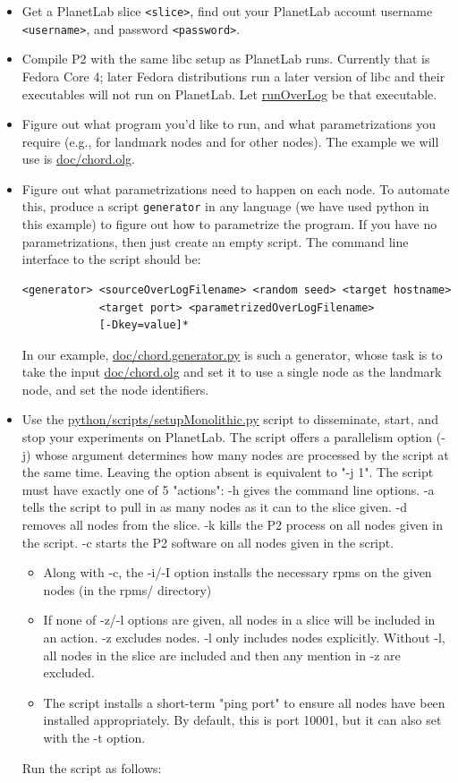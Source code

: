 \documentclass{article}
\begin{document}
\begin{itemize}
\item Get a PlanetLab slice \texttt{<slice>}, find out your PlanetLab account
username \texttt{<username>}, and password \texttt{<password>}.
\item Compile P2 with the same libc setup as PlanetLab runs.  Currently
that is Fedora Core 4; later Fedora distributions run a later version of libc and
their executables will not run on PlanetLab.  Let \url{runOverLog} be that
executable. 
\item Figure out what \ol program you'd like to run, and what
parametrizations you require (e.g., for landmark nodes and for other
nodes).  The example we will use is \url{doc/chord.olg}.
\item Figure out what parametrizations need to happen on each node.  To
automate this, produce a script \texttt{generator} in any language (we have
used python in this example) to figure out how to parametrize the
\ol program. If you have no parametrizations, then just create an
empty script.  The command line interface to the script should be:
\begin{verbatim}
<generator> <sourceOverLogFilename> <random seed> <target hostname>
            <target port> <parametrizedOverLogFilename>
            [-Dkey=value]*
\end{verbatim}
In our example, \url{doc/chord.generator.py} is such a generator, whose task
is to take the input \url{doc/chord.olg} and set it to use a single node as
the landmark node, and set the node identifiers.
\item Use the \url{python/scripts/setupMonolithic.py} script to disseminate,
start, and stop your experiments on PlanetLab.  The script offers a
parallelism option (-j) whose argument determines how many nodes are
processed by the script at the same time. Leaving the option absent is
equivalent to "-j 1".  The script must have exactly one of 5 "actions":
-h gives the command line options. -a tells the script to pull in as
many nodes as it can to the slice given. -d removes all nodes from the
slice. -k kills the P2 process on all nodes given in the script.  -c
starts the P2 software on all nodes given in the script.
\begin{itemize}
\item Along with -c, the -i/-I option installs the necessary rpms on the
     given nodes (in the rpms/ directory)
\item If none of -z/-l options are given, all nodes in a slice will be
     included in an action.  -z excludes nodes.  -l only includes nodes
     explicitly.  Without -l, all nodes in the slice are included and
     then any mention in -z are excluded.
\item The script installs a short-term "ping port" to ensure all nodes
     have been installed appropriately.  By default, this is port 10001,
     but it can also set with the -t option.
\end{itemize}
Run the script as follows:


\end{itemize}
\end{document}
